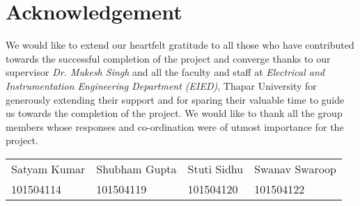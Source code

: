 \chapter*{Acknowledgement}
    We would like to extend our heartfelt gratitude to all those who have contributed towards the successful completion of the project and converge thanks to our supervisor \textit{Dr. Mukesh Singh} and all the faculty and staff at \textit{Electrical and Instrumentation Engineering Department (EIED)}, Thapar University for generously extending their support and for sparing their valuable time to guide us towards the completion of the project.
    We would like to thank all the group members whose responses and co-ordination were of utmost importance for the project.
    \vfill
    \vfill 
    \begin{center}
		\begin{tabular}{l l l l}
			Satyam Kumar&Shubham Gupta&Stuti Sidhu&Swanav Swaroop\\
			101504114&101504119&101504120&101504122\\
		\end{tabular}
    \end{center}
	\vfill
    
    